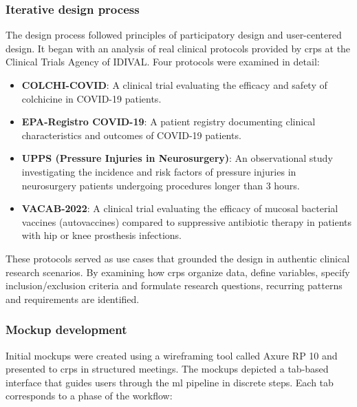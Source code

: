 \documentclass[twoside,final]{Contexto}
\begin{document}
\subsubsection{Iterative design process}

The design process followed principles of participatory design and user-centered design. It began with an analysis of real clinical protocols provided by \glspl{crp} at the Clinical Trials Agency of IDIVAL. Four protocols were examined in detail:

\begin{itemize}
    \item \textbf{COLCHI-COVID}: A clinical trial evaluating the efficacy and safety of colchicine in COVID-19 patients.
    \item \textbf{EPA-Registro COVID-19}: A patient registry documenting clinical characteristics and outcomes of COVID-19 patients.
    \item \textbf{UPPS (Pressure Injuries in Neurosurgery)}: An observational study investigating the incidence and risk factors of pressure injuries in neurosurgery patients undergoing procedures longer than 3 hours.
    \item \textbf{VACAB-2022}: A clinical trial evaluating the efficacy of mucosal bacterial vaccines (autovaccines) compared to suppressive antibiotic therapy in patients with hip or knee prosthesis infections.
\end{itemize}

These protocols served as use cases that grounded the design in authentic clinical research scenarios. By examining how \glspl{crp} organize data, define variables, specify inclusion/exclusion criteria and formulate research questions, recurring patterns and requirements are identified.

\subsubsection{Mockup development}

Initial mockups were created using a wireframing tool called Axure RP 10 and presented to \glspl{crp} in structured meetings. The mockups depicted a tab-based interface that guides users through the \gls{ml} pipeline in discrete steps. Each tab corresponds to a phase of the workflow:
\end{document}
